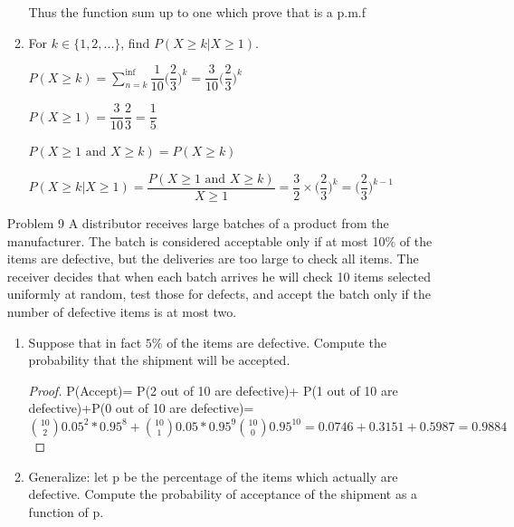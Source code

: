 \documentclass[11pt, oneside]{article}
\begin{document}
\begin{enumerate}
\begin{enumerate}
        Thus the function sum up to one which prove that is a p.m.f
        
        \item For $k\in\{1,2,...\}$, find $P(X\geq k |X \geq 1)$. 
        
        
        $P(X\geq k)=\sum_{n=k}^{\inf} \dfrac{1}{10}\big(\dfrac{2}{3}\big)^k= \dfrac{3}{10}\Big(\dfrac{2}{3}\Big)^k $
        
        $P(X\geq 1)=\dfrac{3}{10}\dfrac{2}{3}= \dfrac{1}{5}$
        
        $P(X\geq 1 \text{ and } X\geq k)= P(X\geq k)$
        
        $P(X\geq k |X \geq 1)=\dfrac{P(X\geq 1 \text{ and }X\geq k)}{X\geq 1}= \dfrac{3}{2}\times \Big( \dfrac{2}{3}\Big)^k=\Big( \dfrac{2}{3}\Big)^{k-1} $
        
    \end{enumerate}
    
    \item[Problem 9]
    A distributor receives large batches of a product from the manufacturer.
    The batch is considered acceptable only if at most 10$\%$ of the items are
    defective, but the deliveries are too large to check all items. The receiver decides
    that when each batch arrives he will check 10 items selected uniformly
    at random, test those for defects, and accept the batch only if the number of
    defective items is at most two.
    \begin{enumerate}
        \item Suppose that in fact $5\%$ of the items are defective. Compute the probability
        that the shipment will be accepted.
        \begin{proof}
        P(Accept)= P(2 out of 10 are defective)+ P(1 out of 10 are defective)+P(0 out of 10 are defective)=${10\choose 2}0.05^2 *0.95^8+{10 \choose 1}0.05*0.95^9 {10\choose 0}0.95^10 =0.0746+0.3151+0.5987=0.9884$
        \end{proof}
        \item Generalize: let p be the percentage of the items which actually are
        defective. Compute the probability of acceptance of the shipment as a
        function of p.
        

\end{enumerate}
\end{enumerate}
\end{document}
